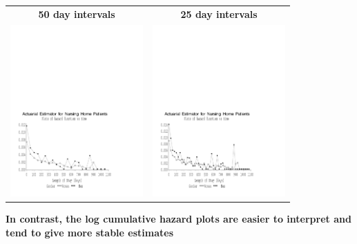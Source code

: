 \documentclass[11pt,psfig]{book}
\begin{document}
\begin{center}
\begin{tabular}{cc}
{\bf 50 day intervals} & {\bf 25 day intervals}\\
\includegraphics[width=2in]{hazards_nh3.pdf} & 
\includegraphics[width=2in]{hazards_nh4.pdf}
\end{tabular}
\end{center}
\noindent
{\bf In contrast, the log cumulative hazard plots are easier to
interpret and tend to give more stable estimates}
\end{document}
